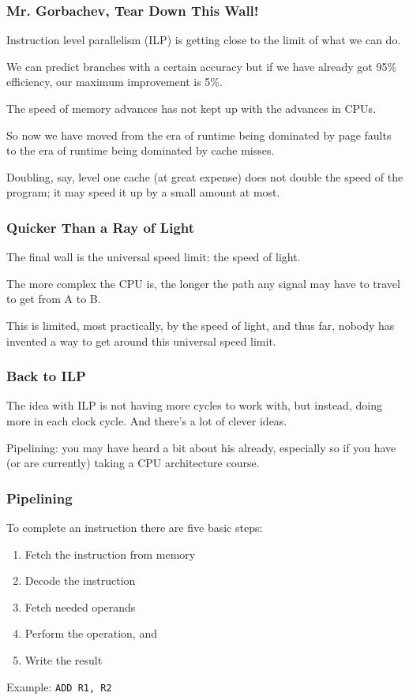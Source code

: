 \begin{frame}
\frametitle{Mr. Gorbachev, Tear Down This Wall!}

Instruction level parallelism (ILP) is getting close to the limit of what we can do. 

We can predict branches with a certain accuracy but if we have already got 95\% efficiency, our maximum improvement is 5\%.

The speed of memory advances has not kept up with the advances in CPUs. 

So now we have moved from the era of runtime being dominated by page faults to the era of runtime being dominated by cache misses. 

Doubling, say, level one cache (at great expense) does not double the speed of the program; it may speed it up by a small amount at most. 

\end{frame}



\begin{frame}
\frametitle{Quicker Than a Ray of Light}

The final wall is the universal speed limit: the speed of light.

 The more complex the CPU is, the longer the path any signal may have to travel to get from A to B. 
 
 This is limited, most practically, by the speed of light, and thus far, nobody has invented a way to get around this universal speed limit.
\end{frame}



\begin{frame}
\frametitle{Back to ILP}

The idea with ILP is not having more cycles to work with, but instead, doing more in each clock cycle. And there's a lot of clever ideas. 

Pipelining: you may have heard a bit about his already, especially so if you have (or are currently) taking a CPU architecture course.
\end{frame}



\begin{frame}
\frametitle{Pipelining}

To complete an instruction there are five basic steps:
\begin{enumerate}
\item Fetch the instruction from memory
\item Decode the instruction
\item Fetch needed operands
\item Perform the operation, and 
\item Write the result
\end{enumerate}

Example: \texttt{ADD R1, R2}


\end{frame}



